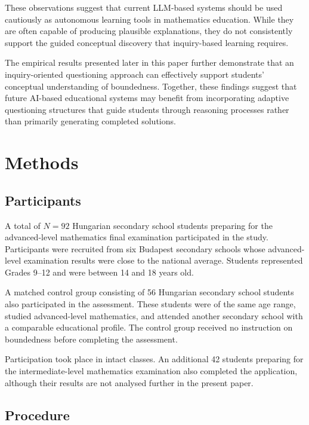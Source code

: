\documentclass[11pt]{article}
\begin{document}
These observations suggest that current LLM-based systems should be used cautiously as autonomous learning tools in mathematics education. While they are often capable of producing plausible explanations, they do not consistently support the guided conceptual discovery that inquiry-based learning requires.

The empirical results presented later in this paper further demonstrate that an inquiry-oriented questioning approach can effectively support students' conceptual understanding of boundedness. Together, these findings suggest that future AI-based educational systems may benefit from incorporating adaptive questioning structures that guide students through reasoning processes rather than primarily generating completed solutions.

\section{Methods}

\subsection{Participants}

A total of $N=92$ Hungarian secondary school students preparing for the advanced-level mathematics final examination participated in the study. Participants were recruited from six Budapest secondary schools whose advanced-level examination results were close to the national average. Students represented Grades 9--12 and were between 14 and 18 years old.

A matched control group consisting of 56 Hungarian secondary school students also participated in the assessment. These students were of the same age range, studied advanced-level mathematics, and attended another secondary school with a comparable educational profile. The control group received no instruction on boundedness before completing the assessment.

Participation took place in intact classes. An additional 42 students preparing for the intermediate-level mathematics examination also completed the application, although their results are not analysed further in the present paper.


\subsection{Procedure}
\end{document}
